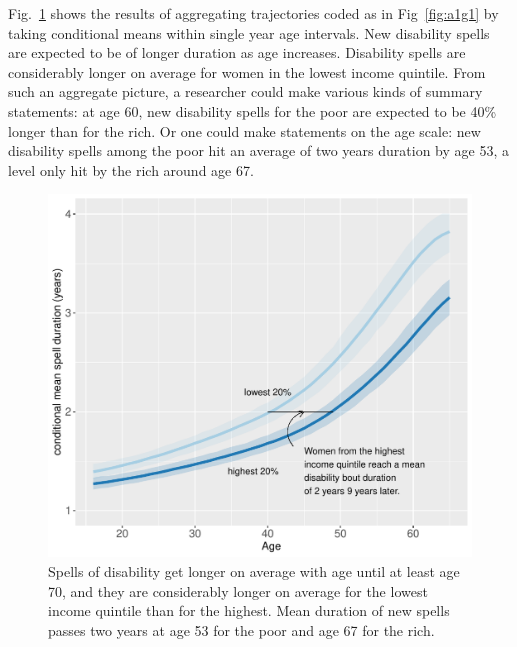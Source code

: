 \documentclass[a4paper,left=1.25cm,right=1.25cm,top=1.25cm,bottom=1.25cm]{article}
\begin{document}
Fig.~\ref{fig:a1m1} shows the results of aggregating trajectories coded as in Fig~\ref{fig:a1g1} by taking conditional means within single year age intervals. New disability spells are expected to be of longer duration as age increases. Disability spells are considerably longer on average for women in the lowest income quintile. From such an aggregate picture, a researcher could make various kinds of summary statements: at age 60, new disability spells for the poor are expected to be 40\% longer than for the rich. Or one could make statements on the age scale: new disability spells among the poor hit an average of two years duration by age 53, a level only hit by the rich around age 67.
\begin{figure}[ht!]
    \centering
    \includegraphics[scale=.6]{Figures/App1_macro1.pdf}
    \caption{Spells of disability get longer on average with age until at least age 70, and they are considerably longer on average for the lowest income quintile than for the highest. Mean duration of new spells passes two years at age 53 for the poor and age 67 for the rich.}
    \label{fig:a1m1}
\end{figure}
\end{document}
